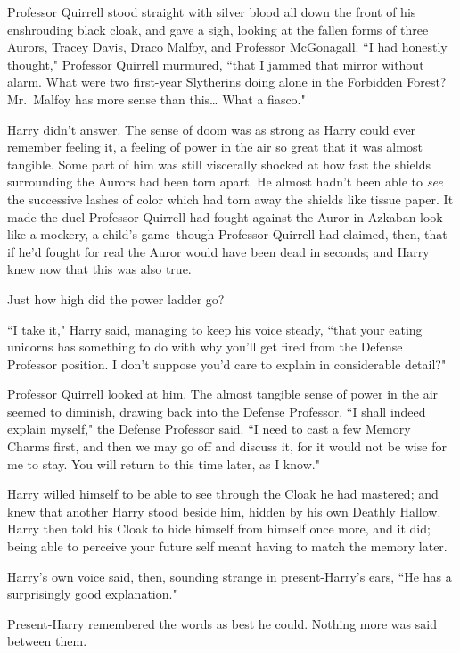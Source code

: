 Professor Quirrell stood straight with silver blood all down the front of his enshrouding black cloak, and gave a sigh, looking at the fallen forms of three Aurors, Tracey Davis, Draco Malfoy, and Professor McGonagall. ``I had honestly thought," Professor Quirrell murmured, ``that I jammed that mirror without alarm. What were two first-year Slytherins doing alone in the Forbidden Forest? Mr.~Malfoy has more sense than this{\ldots} What a fiasco."

Harry didn't answer. The sense of doom was as strong as Harry could ever remember feeling it, a feeling of power in the air so great that it was almost tangible. Some part of him was still viscerally shocked at how fast the shields surrounding the Aurors had been torn apart. He almost hadn't been able to \emph{see} the successive lashes of color which had torn away the shields like tissue paper. It made the duel Professor Quirrell had fought against the Auror in Azkaban look like a mockery, a child's game\---though Professor Quirrell had claimed, then, that if he'd fought for real the Auror would have been dead in seconds; and Harry knew now that this was also true.

Just how high did the power ladder go?

``I take it," Harry said, managing to keep his voice steady, ``that your eating unicorns has something to do with why you'll get fired from the Defense Professor position. I don't suppose you'd care to explain in considerable detail?"

Professor Quirrell looked at him. The almost tangible sense of power in the air seemed to diminish, drawing back into the Defense Professor. ``I shall indeed explain myself," the Defense Professor said. ``I need to cast a few Memory Charms first, and then we may go off and discuss it, for it would not be wise for me to stay. You will return to this time later, as I know."

Harry willed himself to be able to see through the Cloak he had mastered; and knew that another Harry stood beside him, hidden by his own Deathly Hallow. Harry then told his Cloak to hide himself from himself once more, and it did; being able to perceive your future self meant having to match the memory later.

Harry's own voice said, then, sounding strange in present-Harry's ears, ``He has a surprisingly good explanation."

Present-Harry remembered the words as best he could. Nothing more was said between them.

